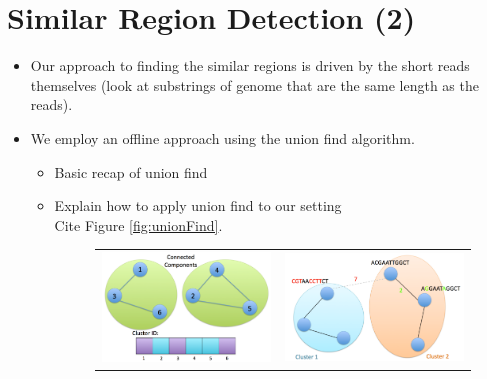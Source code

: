 \documentclass[10pt]{article}
\begin{document}
\section{Similar Region Detection (2)}

\begin{itemize}
\item{Our approach to finding the similar regions is driven by the short reads themselves (look at substrings of genome that are the same length as the reads).}
\item{We employ an offline approach using the union find algorithm.}
\begin{itemize}
\item{Basic recap of union find}
\item{Explain how to apply union find to our setting}\\
Cite Figure \ref{fig:unionFind}.
\begin{figure}
\centering
\begin{tabular}{c c}
\includegraphics[scale=0.25]{basicUnionFind} & \includegraphics[scale=0.25]{applyingUnionFind}

\end{tabular}
\end{figure}
\end{itemize}
\end{itemize}
\end{document}
